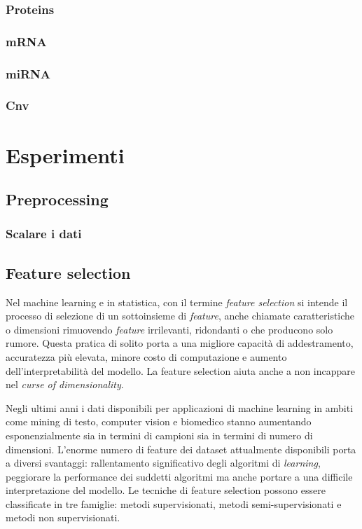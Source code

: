 \documentclass[12pt,italian]{report}
\begin{document}
	\subsection{Proteins}
	\subsection{mRNA}
	\subsection{miRNA}
	\subsection{Cnv}
	
	
	
	\chapter{Esperimenti}
	\section{Preprocessing}
	\subsection{Scalare i dati}
	\section{Feature selection}
	Nel machine learning e in statistica, con il termine \textit{feature selection} si intende il processo di selezione di un sottoinsieme di \textit{feature}, anche chiamate caratteristiche o dimensioni rimuovendo \textit{feature} irrilevanti, ridondanti o che producono solo rumore. Questa pratica di solito porta a una migliore capacità di addestramento, accuratezza più elevata, minore costo di computazione e aumento dell'interpretabilità del modello. La feature selection aiuta anche a non incappare nel \textit{curse of dimensionality}.
	
	Negli ultimi anni i dati disponibili per applicazioni di machine learning in ambiti come mining di testo, computer vision e biomedico stanno aumentando esponenzialmente sia in termini di campioni sia in termini di numero di dimensioni. L'enorme numero di feature dei dataset attualmente disponibili porta a diversi svantaggi: rallentamento significativo degli algoritmi di \textit{learning}, peggiorare la performance dei suddetti algoritmi ma anche portare a una difficile interpretazione del modello.
	Le tecniche di feature selection possono essere classificate in tre famiglie: metodi supervisionati, metodi semi-supervisionati e metodi non supervisionati.
	
\end{document}
